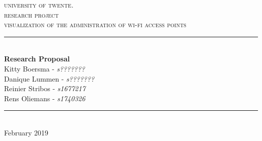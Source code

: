 \begin{titlepage}
    \newcommand{\HRule}{\rule{\linewidth}{0.4mm}} 
    \center
        \textsc{\LARGE university of twente.}\\[1.5cm]
        \textsc{\Large research project}\\
        \textsc{\Large visualization of the administration of wi-fi access points}\\[0.5cm]
    \HRule \\[0.4cm]
        {\huge \bfseries Research Proposal}\\[0.4cm]
            {\large Kitty Boersma - \textit{s???????}\\
            \large Danique Lummen - \textit{s???????}\\
            \large Reinier Stribos - \textit{s1677217}\\
            \large Rens Oliemans - \textit{s1740326}\\}
    \HRule \\[1.5cm]
        {\large February 2019}\\[1cm]
    \vfill
\end{titlepage}